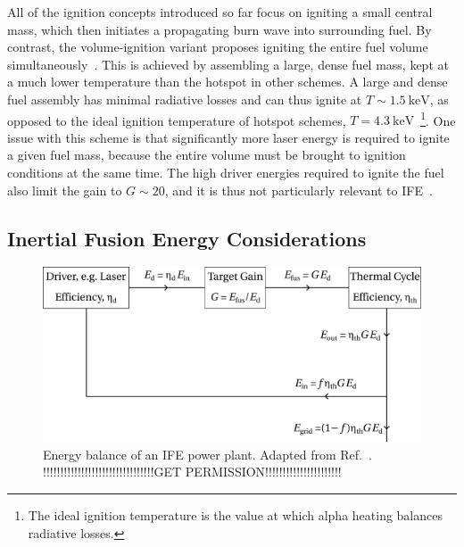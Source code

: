 All of the ignition concepts introduced so far focus on igniting a small central mass, which then initiates a propagating burn wave into surrounding fuel.
By contrast, the volume-ignition variant proposes igniting the entire fuel volume simultaneously~\cite{khoda-bakhsh_advanced_1992,molvig_low_2016}.
This is achieved by assembling a large, dense fuel mass, kept at a much lower temperature than the hotspot in other schemes.
A large and dense fuel assembly has minimal radiative losses and can thus ignite at $T\sim1.5\ \text{keV}$, as opposed to the ideal ignition temperature of hotspot schemes, $T=4.3\ \text{keV}$~\cite{atzeni_physics_2004}\footnote{The ideal ignition temperature is the value at which alpha heating balances radiative losses.}.
One issue with this scheme is that significantly more laser energy is required to ignite a given fuel mass, because the entire volume must be brought to ignition conditions at the same time.
The high driver energies required to ignite the fuel also limit the gain to $G\sim20$, and it is thus not particularly relevant to \ac{IFE}~\cite{atzeni_physics_2004}.

\subsection{Inertial Fusion Energy Considerations}%
\label{sec:intro_IFE_gain}

\begin{figure}[t!]
    \includegraphics[width=0.8\linewidth]{Introduction/Images/IFE_powerplant.png}
    \centering
    \caption{Energy balance of an \ac{IFE} power plant.
    Adapted from Ref.~\cite{atzeni_physics_2004}.
    !!!!!!!!!!!!!!!!!!!!!!!!!!!!!!!!GET PERMISSION!!!!!!!!!!!!!!!!!!!!!!
    }%
    \label{fig:intro_IFE_energy_balance}
\end{figure}

